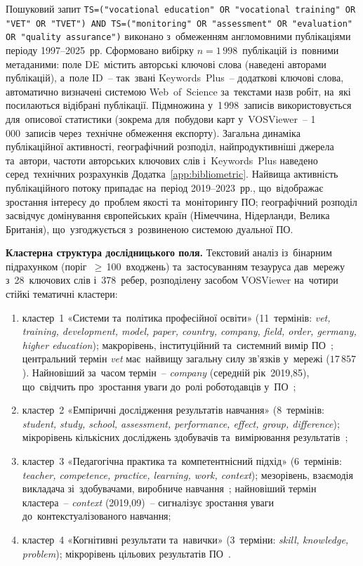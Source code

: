 Пошуковий запит \texttt{TS=("vocational education" OR "vocational training" OR "VET" OR "TVET")\,AND\,TS=("monitoring" OR "assessment" OR "evaluation" OR "quality assurance")} виконано з~обмеженням англомовними публікаціями періоду 1997--2025~рр. Сформовано вибірку $n=1\,998$~публікацій із~повними метаданими: поле DE~містить авторські ключові слова (наведені авторами публікацій), а~поле ID~-- так~звані Keywords~Plus~-- додаткові ключові слова, автоматично визначені системою Web~of~Science за~текстами назв робіт, на~які посилаються відібрані публікації. Підмножина у~1\,998~записів використовується для~описової статистики (зокрема для~побудови карт у~VOSViewer~-- 1\,000~записів через~технічне обмеження експорту). Загальна динаміка публікаційної активності, географічний розподіл, найпродуктивніші джерела та~автори, частоти авторських ключових слів і~Keywords~Plus наведено серед~технічних розрахунків Додатка~\ref{app:bibliometric}. Найвища активність публікаційного потоку припадає на~період 2019--2023~рр., що~відображає зростання інтересу до~проблем якості та~моніторингу ПО; географічний розподіл засвідчує домінування європейських країн (Німеччина, Нідерланди, Велика Британія), що~узгоджується з~розвиненою системою дуальної ПО.

\textbf{Кластерна структура дослідницького поля.} Текстовий аналіз із~бінарним підрахунком (поріг~$\geq$\,100~входжень) та~застосуванням тезауруса дав~мережу з~28~ключових слів і~378~ребер, розподілену засобом VOSViewer на~чотири стійкі тематичні кластери:

\begin{enumerate}
    \item кластер~1 «Системи та~політика професійної освіти» (11~термінів: \textit{vet, training, development, model, paper, country, company, field, order, germany, higher education}); макрорівень, інституційний та~системний вимір ПО~\cite{Pilz2017, Euler2013}; центральний термін \textit{vet} має~найвищу загальну силу зв'язків у~мережі ($17\,857$). Найновіший за~часом термін~-- \textit{company} (середній рік~2019,85), що~свідчить про~зростання уваги до~ролі роботодавців у~ПО~\cite{Busemeyer2012, Bosch2008};
    \item кластер~2 «Емпіричні дослідження результатів навчання» (8~термінів: \textit{student, study, school, assessment, performance, effect, group, difference}); мікрорівень кількісних досліджень здобувачів та~вимірювання результатів~\cite{Hanushek2017, Eichhorst2015, Ryan2001};
    \item кластер~3 «Педагогічна практика та~компетентнісний підхід» (6~термінів: \textit{teacher, competence, practice, learning, work, context}); мезорівень, взаємодія викладача зі~здобувачами, виробниче навчання~\cite{Mulder2014, Tynjala2008, Billett2011}; найновіший термін кластера~-- \textit{context} (2019,09)~-- сигналізує зростання уваги до~контекстуалізованого навчання;
    \item кластер~4 «Когнітивні результати та~навички» (3~терміни: \textit{skill, knowledge, problem}); мікрорівень цільових результатів ПО~\cite{Rauner2008, Winch2010, Wheelahan2010}.
\end{enumerate}

